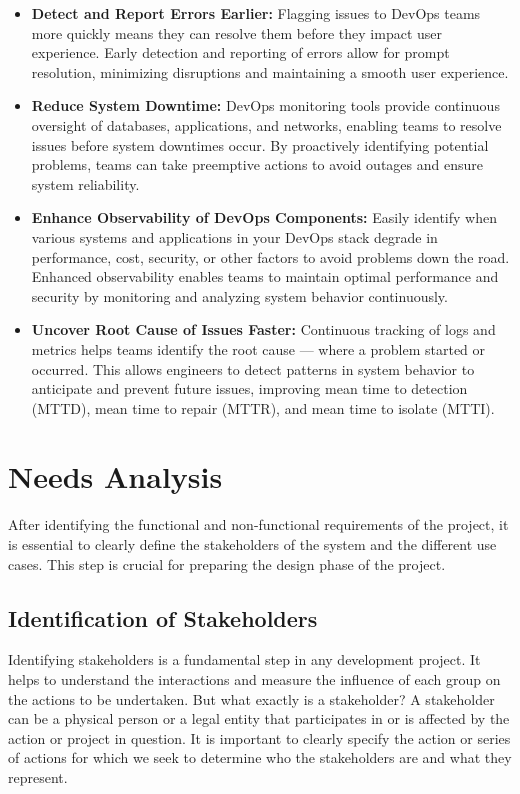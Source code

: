 \begin{itemize}
  \item \textbf{Detect and Report Errors Earlier:}
  Flagging issues to DevOps teams more quickly means they can resolve them before they impact user experience. Early detection and reporting of errors allow for prompt resolution, minimizing disruptions and maintaining a smooth user experience.
  \item \textbf{Reduce System Downtime:}
  DevOps monitoring tools provide continuous oversight of databases, applications, and networks, enabling teams to resolve issues before system downtimes occur. By proactively identifying potential problems, teams can take preemptive actions to avoid outages and ensure system reliability.
  \item \textbf{Enhance Observability of DevOps Components:}
  Easily identify when various systems and applications in your DevOps stack degrade in performance, cost, security, or other factors to avoid problems down the road. Enhanced observability enables teams to maintain optimal performance and security by monitoring and analyzing system behavior continuously.

  \item \textbf{Uncover Root Cause of Issues Faster:}
  Continuous tracking of logs and metrics helps teams identify the root cause — where a problem started or occurred. This allows engineers to detect patterns in system behavior to anticipate and prevent future issues, improving mean time to detection (MTTD), mean time to repair (MTTR), and mean time to isolate (MTTI).
\end{itemize}

\section{Needs Analysis}
\label{sec:needs_analysis}

After identifying the functional and non-functional requirements of the project, it is essential to clearly define the stakeholders of the system and the different use cases. This step is crucial for preparing the design phase of the project.

\subsection{Identification of Stakeholders}
\label{subsec:identification_stakeholders}

Identifying stakeholders is a fundamental step in any development project. It helps to understand the interactions and measure the influence of each group on the actions to be undertaken. But what exactly is a stakeholder? A stakeholder can be a physical person or a legal entity that participates in or is affected by the action or project in question. It is important to clearly specify the action or series of actions for which we seek to determine who the stakeholders are and what they represent.

